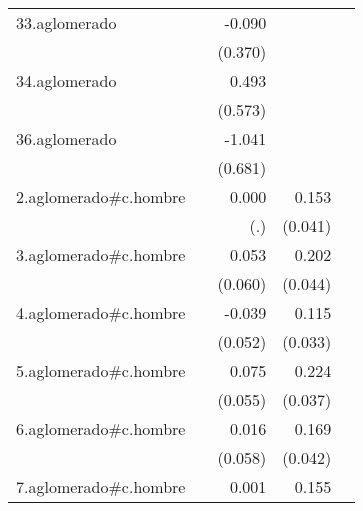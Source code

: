 {\begin{longtable}{l*{4}{D{.}{.}{-1}}}
\addlinespace
33.aglomerado&                     &      -0.090         &                     &                     \\
            &                     &     (0.370)         &                     &                     \\
\addlinespace
34.aglomerado&                     &       0.493         &                     &                     \\
            &                     &     (0.573)         &                     &                     \\
\addlinespace
36.aglomerado&                     &      -1.041         &                     &                     \\
            &                     &     (0.681)         &                     &                     \\
\addlinespace
2.aglomerado#c.hombre&                     &       0.000         &       0.153\sym{***}&                     \\
            &                     &         (.)         &     (0.041)         &                     \\
\addlinespace
3.aglomerado#c.hombre&                     &       0.053         &       0.202\sym{***}&                     \\
            &                     &     (0.060)         &     (0.044)         &                     \\
\addlinespace
4.aglomerado#c.hombre&                     &      -0.039         &       0.115\sym{***}&                     \\
            &                     &     (0.052)         &     (0.033)         &                     \\
\addlinespace
5.aglomerado#c.hombre&                     &       0.075         &       0.224\sym{***}&                     \\
            &                     &     (0.055)         &     (0.037)         &                     \\
\addlinespace
6.aglomerado#c.hombre&                     &       0.016         &       0.169\sym{***}&                     \\
            &                     &     (0.058)         &     (0.042)         &                     \\
\addlinespace
7.aglomerado#c.hombre&                     &       0.001         &       0.155\sym{***}&                     \\

\end{longtable}}
